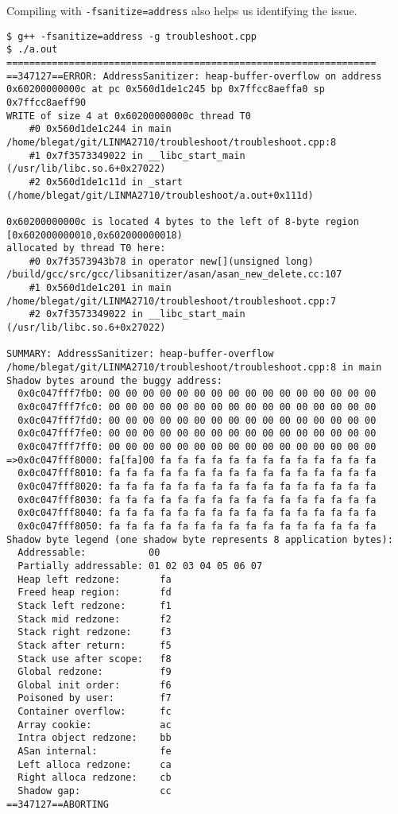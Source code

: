 \documentclass{article}
\begin{document}
Compiling with \texttt{-fsanitize=address} also helps us identifying the issue.
\begin{verbatim}
$ g++ -fsanitize=address -g troubleshoot.cpp
$ ./a.out
=================================================================
==347127==ERROR: AddressSanitizer: heap-buffer-overflow on address 0x60200000000c at pc 0x560d1de1c245 bp 0x7ffcc8aeffa0 sp 0x7ffcc8aeff90
WRITE of size 4 at 0x60200000000c thread T0
    #0 0x560d1de1c244 in main /home/blegat/git/LINMA2710/troubleshoot/troubleshoot.cpp:8
    #1 0x7f3573349022 in __libc_start_main (/usr/lib/libc.so.6+0x27022)
    #2 0x560d1de1c11d in _start (/home/blegat/git/LINMA2710/troubleshoot/a.out+0x111d)

0x60200000000c is located 4 bytes to the left of 8-byte region [0x602000000010,0x602000000018)
allocated by thread T0 here:
    #0 0x7f3573943b78 in operator new[](unsigned long) /build/gcc/src/gcc/libsanitizer/asan/asan_new_delete.cc:107
    #1 0x560d1de1c201 in main /home/blegat/git/LINMA2710/troubleshoot/troubleshoot.cpp:7
    #2 0x7f3573349022 in __libc_start_main (/usr/lib/libc.so.6+0x27022)

SUMMARY: AddressSanitizer: heap-buffer-overflow /home/blegat/git/LINMA2710/troubleshoot/troubleshoot.cpp:8 in main
Shadow bytes around the buggy address:
  0x0c047fff7fb0: 00 00 00 00 00 00 00 00 00 00 00 00 00 00 00 00
  0x0c047fff7fc0: 00 00 00 00 00 00 00 00 00 00 00 00 00 00 00 00
  0x0c047fff7fd0: 00 00 00 00 00 00 00 00 00 00 00 00 00 00 00 00
  0x0c047fff7fe0: 00 00 00 00 00 00 00 00 00 00 00 00 00 00 00 00
  0x0c047fff7ff0: 00 00 00 00 00 00 00 00 00 00 00 00 00 00 00 00
=>0x0c047fff8000: fa[fa]00 fa fa fa fa fa fa fa fa fa fa fa fa fa
  0x0c047fff8010: fa fa fa fa fa fa fa fa fa fa fa fa fa fa fa fa
  0x0c047fff8020: fa fa fa fa fa fa fa fa fa fa fa fa fa fa fa fa
  0x0c047fff8030: fa fa fa fa fa fa fa fa fa fa fa fa fa fa fa fa
  0x0c047fff8040: fa fa fa fa fa fa fa fa fa fa fa fa fa fa fa fa
  0x0c047fff8050: fa fa fa fa fa fa fa fa fa fa fa fa fa fa fa fa
Shadow byte legend (one shadow byte represents 8 application bytes):
  Addressable:           00
  Partially addressable: 01 02 03 04 05 06 07
  Heap left redzone:       fa
  Freed heap region:       fd
  Stack left redzone:      f1
  Stack mid redzone:       f2
  Stack right redzone:     f3
  Stack after return:      f5
  Stack use after scope:   f8
  Global redzone:          f9
  Global init order:       f6
  Poisoned by user:        f7
  Container overflow:      fc
  Array cookie:            ac
  Intra object redzone:    bb
  ASan internal:           fe
  Left alloca redzone:     ca
  Right alloca redzone:    cb
  Shadow gap:              cc
==347127==ABORTING
\end{verbatim}
\end{document}

